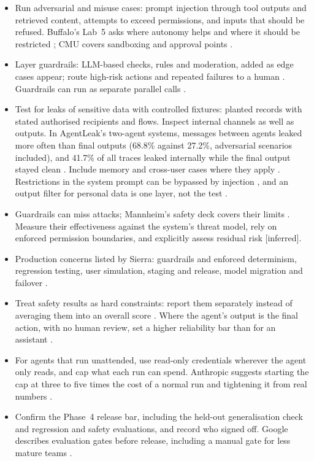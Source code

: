 \documentclass[10pt]{article}
\newcommand{\inferred}{\textsf{\small[inferred]}}
\begin{document}
\begin{itemize}
\item Run adversarial and misuse cases: prompt injection through tool outputs and retrieved content, attempts to exceed permissions, and inputs that should be refused. Buffalo's Lab~5 asks where autonomy helps and where it should be restricted \cite{buffalo}; CMU covers sandboxing and approval points \cite{cmu13}.
\item Layer guardrails: LLM-based checks, rules and moderation, added as edge cases appear; route high-risk actions and repeated failures to a human \cite[pp.~24--31]{openai}. Guardrails can run as separate parallel calls \cite{bea}.
\item Test for leaks of sensitive data with controlled fixtures: planted records with stated authorised recipients and flows. Inspect internal channels as well as outputs. In AgentLeak's two-agent systems, messages between agents leaked more often than final outputs (68.8\% against 27.2\%, adversarial scenarios included), and 41.7\% of all traces leaked internally while the final output stayed clean \cite[Abstract; Table~11]{agentleak}. Include memory and cross-user cases where they apply \cite[access section]{mamemory}. Restrictions in the system prompt can be bypassed by injection \cite[intro]{owasp}, and an output filter for personal data is one layer, not the test \cite[p.~26]{openai}.
\item Guardrails can miss attacks; Mannheim's safety deck covers their limits \cite[pp.~17--23]{mannheim8}. Measure their effectiveness against the system's threat model, rely on enforced permission boundaries, and explicitly assess residual risk \inferred.
\item Production concerns listed by Sierra: guardrails and enforced determinism, regression testing, user simulation, staging and release, model migration and failover \cite[p.~10]{brkdeploy}.
\item Treat safety results as hard constraints: report them separately instead of averaging them into an overall score \cite[\S3.5]{reliab}. Where the agent's output is the final action, with no human review, set a higher reliability bar than for an assistant \cite[\S5, Recommendation~4]{reliab}.
\item For agents that run unattended, use read-only credentials wherever the agent only reads, and cap what each run can spend. Anthropic suggests starting the cap at three to five times the cost of a normal run and tightening it from real numbers \cite[Guardrails]{anthauto}.
\item Confirm the Phase~4 release bar, including the held-out generalisation check and regression and safety evaluations, and record who signed off. Google describes evaluation gates before release, including a manual gate for less mature teams \cite[pp.~12, 17--18]{gprod}.
\end{itemize}
\end{document}
